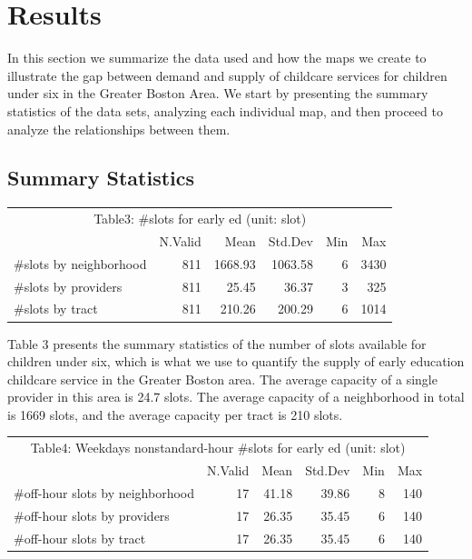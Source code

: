 \documentclass[10pt,letterpaper]{article}
\begin{document}
\section{Results}\label{results}

In this section we summarize the data used and how the maps we create to
illustrate the gap between demand and supply of childcare services for
children under six in the Greater Boston Area. We start by presenting
the summary statistics of the data sets, analyzing each individual map,
and then proceed to analyze the relationships between them.

\subsection{Summary Statistics}\label{summary-statistics}

\begin{table}[!h]
\centering\begingroup\fontsize{10}{12}\selectfont

\begin{tabular}{l|r|r|r|r|r}
\hline
\multicolumn{6}{c|}{Table3: \#slots for early ed (unit: slot)} \\
\cline{1-6}
  & N.Valid & Mean & Std.Dev & Min & Max\\
\hline
\rowcolor{gray!6}  \#slots by neighborhood & 811 & 1668.93 & 1063.58 & 6 & 3430\\
\hline
\#slots by providers & 811 & 25.45 & 36.37 & 3 & 325\\
\hline
\rowcolor{gray!6}  \#slots by tract & 811 & 210.26 & 200.29 & 6 & 1014\\
\hline
\end{tabular}
\endgroup{}
\end{table}

Table 3 presents the summary statistics of the number of slots available
for children under six, which is what we use to quantify the supply of
early education childcare service in the Greater Boston area. The
average capacity of a single provider in this area is 24.7 slots. The
average capacity of a neighborhood in total is 1669 slots, and the
average capacity per tract is 210 slots.

\begin{table}[!h]
\centering\begingroup\fontsize{10}{12}\selectfont

\begin{tabular}{l|r|r|r|r|r}
\hline
\multicolumn{6}{c|}{Table4: Weekdays nonstandard-hour \#slots for early ed (unit: slot)} \\
\cline{1-6}
  & N.Valid & Mean & Std.Dev & Min & Max\\
\hline
\rowcolor{gray!6}  \#off-hour slots by neighborhood & 17 & 41.18 & 39.86 & 8 & 140\\
\hline
\#off-hour slots by providers & 17 & 26.35 & 35.45 & 6 & 140\\
\hline
\rowcolor{gray!6}  \#off-hour slots by tract & 17 & 26.35 & 35.45 & 6 & 140\\
\hline
\end{tabular}
\endgroup{}
\end{table}
\end{document}
